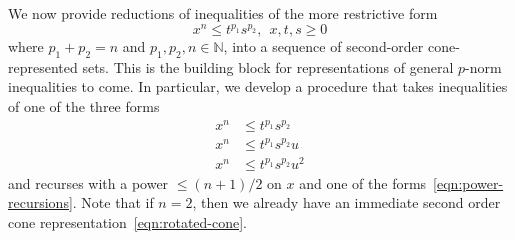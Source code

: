 \documentclass[11pt]{article}
\newcommand{\N}{\mathbb{N}}
\begin{document}
We now provide reductions of inequalities of the more restrictive form
\begin{equation}
  \label{eqn:initial-power}
  x^n \le t^{p_1} s^{p_2}, ~~ x, t, s \ge 0
\end{equation}
where $p_1 + p_2 = n$ and $p_1, p_2, n \in \N$, into a sequence of
second-order cone-represented sets. This is the building block for
representations of general $p$-norm inequalities to come. In particular, we
develop a procedure that takes inequalities of one of the three forms
\begin{subequations}
  \label{eqn:power-recursions}
  \begin{align}
    \label{eqn:zero-power}
    x^n & \le t^{p_1} s^{p_2} \\
    \label{eqn:one-power}
    x^n & \le t^{p_1} s^{p_2} u \\
    \label{eqn:two-power}
    x^n & \le t^{p_1} s^{p_2} u^2
  \end{align}
\end{subequations}
and recurses with a power $\le (n + 1)/2$ on $x$ and one of the
forms~\eqref{eqn:power-recursions}. Note that if $n = 2$, then we already
have an immediate second order cone representation~\eqref{eqn:rotated-cone}.
\end{document}
